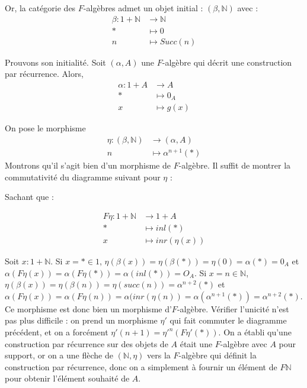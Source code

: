\documentclass{article}
\newcommand{\N}{\mathbb{N}}
\begin{document}
Or, la catégorie des $F$-algèbres admet un objet initial : $(\beta, \N)$ avec : 
\begin{align*}
\beta : 1 + \N & \rightarrow \N \\
        * & \mapsto 0 \\ 
        n & \mapsto Succ(n)
\end{align*}

Prouvons son initialité. Soit $(\alpha, A)$ une $F$-algèbre qui décrit une construction par récurrence. Alors, 
\begin{align*}
    \alpha : 1 + A & \rightarrow A \\ 
    * & \mapsto 0_A \\ 
    x & \mapsto g(x)
\end{align*}

On pose le morphisme 
\begin{align*}
    \eta : (\beta, \N) & \rightarrow ( \alpha, A) \\ 
    n & \mapsto \alpha^{n+1}(*)    
\end{align*} 
Montrons qu'il s'agit bien d'un morphisme de $F$-algèbre. Il suffit de montrer la commutativité du diagramme suivant pour $\eta$ : 
\begin{center}
\end{center}

Sachant que :

\begin{align*}
    F \eta : 1 + \N & \rightarrow 1 + A \\ 
        * & \mapsto inl(*) \\ 
        x & \mapsto inr(\eta(x))  
\end{align*}

Soit $x : 1 + \N$. Si $x = * \in 1$, $ \eta(\beta(x)) = \eta(\beta(*)) = \eta(0) = \alpha(*) = 0_A $ et $ \alpha(F \eta (x)) = \alpha( F \eta (*)) = \alpha(inl(*)) = O_A $. Si $x = n \in \N$, $ \eta(\beta(x)) = \eta(\beta(n)) = \eta(succ(n)) = \alpha^{n+2}(*) $ et $ \alpha( F \eta (x)) = \alpha(F \eta (n)) = \alpha(inr(\eta(n)) = \alpha(\alpha^{n+1}(*)) = \alpha^{n+2}(*) $. Ce morphisme est donc bien un morphisme d'$F$-algèbre. Vérifier l'unicité n'est pas plus difficile : on prend un morphisme $\eta'$ qui fait commuter le diagramme précédent, et on a forcément $\eta'(n+1) = \eta'^n(F\eta'(*)) $. On a établi qu'une construction par récurrence sur des objets de $A$ était une $F$-algèbre avec $A$ pour support, or on a une flèche de $(\N, \eta)$ vers la $F$-algèbre qui définit la construction par récurrence, donc on a simplement à fournir un élément de $F\N$ pour obtenir l'élément souhaité de $A$. 
\end{document}
